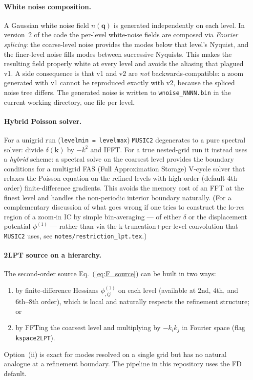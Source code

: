 \documentclass[12pt]{article}
\newcommand{\bq}{\mathbf{q}}
\newcommand{\bk}{\mathbf{k}}
\begin{document}
\paragraph{White noise composition.}  A Gaussian white noise field
$n(\bq)$ is generated independently on each level.  In version~2 of
the code the per-level white-noise fields are composed via
\emph{Fourier splicing}: the coarse-level noise provides the modes
below that level's Nyquist, and the finer-level noise fills modes
between successive Nyquists.  This makes the resulting field properly
white at every level and avoids the aliasing that plagued v1.  A side
consequence is that v1 and v2 are \emph{not} backwards-compatible:
a zoom generated with v1 cannot be reproduced exactly with v2, because
the spliced noise tree differs.  The generated noise is written to
\texttt{wnoise\_NNNN.bin} in the current working directory, one file
per level.

\paragraph{Hybrid Poisson solver.}  For a unigrid run (\texttt{levelmin
= levelmax}) \texttt{MUSIC2} degenerates to a pure spectral solver:
divide $\delta(\bk)$ by $-k^2$ and IFFT.  For a true nested-grid run
it instead uses a \emph{hybrid} scheme: a spectral solve on the
coarsest level provides the boundary conditions for a multigrid FAS
(Full Approximation Storage) V-cycle solver that relaxes the Poisson
equation on the refined levels with
high-order (default 4th-order) finite-difference gradients.  This
avoids the memory cost of an FFT at the finest level and handles the
non-periodic interior boundary naturally.  (For a complementary
discussion of what goes wrong if one tries to construct the lo-res
region of a zoom-in IC by simple bin-averaging --- of either $\delta$
or the displacement potential $\phi^{(1)}$ --- rather than via the
k-truncation+per-level convolution that \texttt{MUSIC2} uses, see
\texttt{notes/restriction\_lpt.tex}.)

\paragraph{2LPT source on a hierarchy.}  The second-order source
Eq.~(\ref{eq:F_source}) can be built in two ways:
\begin{enumerate}
  \item by finite-difference Hessians
        $\phi^{(1)}_{,ij}$ on each level (available at 2nd, 4th, and
        6th--8th order), which is local and naturally respects the
        refinement structure; or
  \item by FFTing the coarsest level and multiplying by $-k_i k_j$
        in Fourier space (flag \texttt{kspace2LPT}).
\end{enumerate}
Option~(ii) is exact for modes resolved on a single grid but has no
natural analogue at a refinement boundary.  The pipeline in this
repository uses the FD default.
\end{document}
